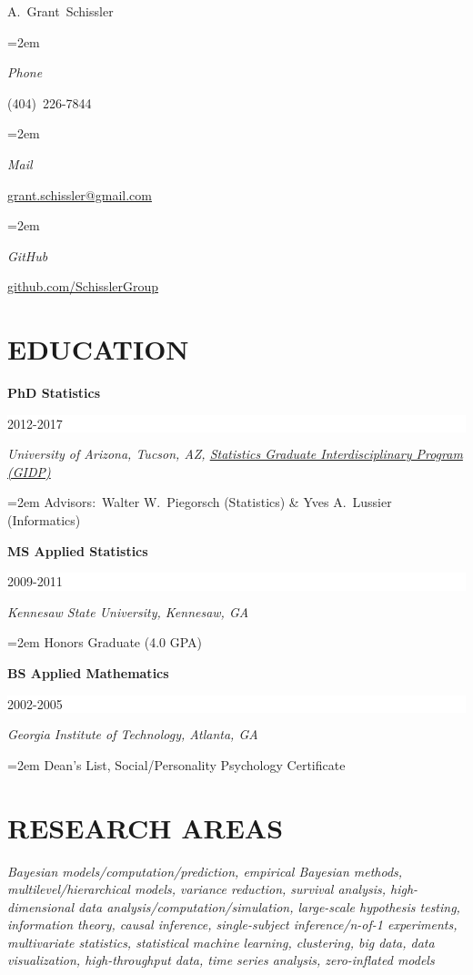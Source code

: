 \documentclass[paper=a4,fontsize=11pt]{scrartcl} %
\newlength{\spacebox}
\newcommand{\sepspace}{\vspace*{1em}}		%
\newcommand{\MyName}[1]{ %
		\LARGE \usefont{OT1}{phv}{b}{n} \hfill #1
		\par \normalsize \normalfont}
\newcommand{\MySlogan}[1]{ %
		\large \usefont{OT1}{phv}{m}{n}\hfill \textit{#1}
		\par \normalsize \normalfont}
\newcommand{\NewPart}[2]{\section*{\uppercase{#1} #2 }}
\newcommand{\PersonalEntry}[2]{
		\noindent\hangindent=2em\hangafter=0 %
		\parbox{\spacebox}{        %
		\textit{#1}}		       %
		\hspace{1.5em} #2 \par}    %
\newcommand{\EducationEntry}[4]{
		\noindent \textbf{#1} \hfill      %
		\colorbox{White}{%
			\parbox{6em}{%
			\hfill\color{Black}#2}} \par  %
		\noindent \textit{#3} \par        %
		\noindent\hangindent=2em\hangafter=0 \small #4 %
		\normalsize \par \vspace{-7pt}}
\begin{document}
 


\MyName{A.~Grant~Schissler}
\vspace{5pt}
\vspace{-20pt}

\vspace{-8pt}
\PersonalEntry{Phone}{(404)~226-7844}
\PersonalEntry{Mail}{\href{mailto:grant.schissler@gmail.com}{grant.schissler@gmail.com}}
\PersonalEntry{GitHub}{\href{https://github.com/SchisslerGroup}{github.com/SchisslerGroup}}
\vspace{-7pt}
\NewPart{Education}{}
\vspace{-7pt}
\EducationEntry{PhD Statistics}{2012-2017}{University of Arizona, Tucson, AZ, \href{http://stat.arizona.edu}{Statistics Graduate Interdisciplinary Program (GIDP)}}{Advisors:~Walter W.~Piegorsch (Statistics) \& Yves A.~Lussier (Informatics)}
\sepspace

\EducationEntry{MS Applied Statistics}{2009-2011}{Kennesaw State University, Kennesaw, GA}{Honors Graduate (4.0 GPA)}
\sepspace

\EducationEntry{BS Applied Mathematics}{2002-2005}{Georgia Institute of Technology, Atlanta, GA}{Dean's List, Social/Personality Psychology Certificate}

\NewPart{Research areas}{}
\vspace{-7pt}

\emph{Bayesian models/computation/prediction, empirical Bayesian methods, multilevel/hierarchical models, variance reduction, survival analysis, high-dimensional data analysis/computation/simulation, large-scale hypothesis testing, information theory, causal inference, single-subject inference/n-of-1 experiments, multivariate statistics, statistical machine learning, clustering, big data, data visualization, high-throughput data, time series analysis, zero-inflated models}
\end{document}
